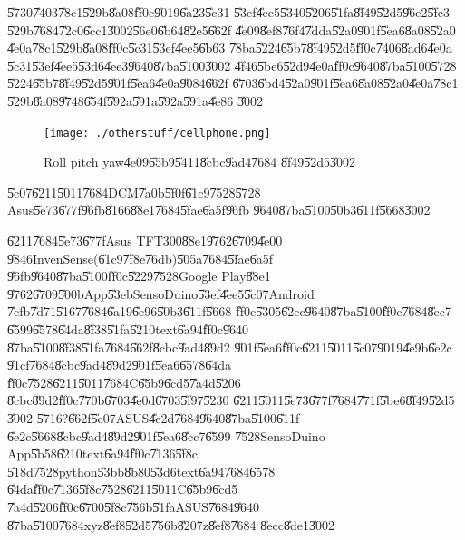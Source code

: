 \U{5730}\U{7403}\U{78c1}\U{529b}\U{8a08}\U{ff0c}\U{9019}\U{6a23}\U{5c31}%
\U{53ef}\U{4ee5}\U{5340}\U{5206}\U{51fa}\U{8f49}\U{52d5}\U{96e2}\U{5fc3}%
\U{529b}\U{7684}\U{72c0}\U{6cc1}\U{3002}\U{56e0}\U{6b64}\U{82e5}\U{662f}%
\U{4e09}\U{8ef8}\U{76f4}\U{7dda}\U{52a0}\U{901f}\U{5ea6}\U{8a08}\U{52a0}%
\U{4e0a}\U{78c1}\U{529b}\U{8a08}\U{ff0c}\U{5c31}\U{53ef}\U{4ee5}\U{6b63}%
\U{78ba}\U{5224}\U{65b7}\U{8f49}\U{52d5}\U{ff0c}\U{7406}\U{8ad6}\U{4e0a}%
\U{5c31}\U{53ef}\U{4ee5}\U{53d6}\U{4ee3}\U{9640}\U{87ba}\U{5100}\U{3002}%
\U{4f46}\U{5be6}\U{52d9}\U{4e0a}\U{ff0c}\U{9640}\U{87ba}\U{5100}\U{5728}%
\U{5224}\U{65b7}\U{8f49}\U{52d5}\U{901f}\U{5ea6}\U{4e0a}\U{9084}\U{662f}%
\U{6703}\U{6bd4}\U{52a0}\U{901f}\U{5ea6}\U{8a08}\U{52a0}\U{4e0a}\U{78c1}%
\U{529b}\U{8a08}\U{9748}\U{654f}\U{592a}\U{591a}\U{592a}\U{591a}\U{4e86}%
\U{3002}

\clearpage%

\begin{figure}[th]
\caption{Roll pitch yaw\U{4e09}\U{65b9}\U{5411}\U{8cbc}\U{9ad4}\U{7684}%
\U{8f49}\U{52d5}\U{3002}}
\begin{center}
\texttt{[image: ./otherstuff/cellphone.png]}
\end{center}
\end{figure}

\begin{case}
\U{5c07}\U{6211}\U{5011}\U{7684}DCM\U{7a0b}\U{5f0f}\U{61c9}\U{7528}\U{5728}%
Asus\U{5e73}\U{677f}\U{96fb}\U{8166}\U{88e1}\U{7684}\U{5fae}\U{6a5f}\U{96fb}%
\U{9640}\U{87ba}\U{5100}\U{50b3}\U{611f}\U{5668}\U{3002}
\end{case}

\U{6211}\U{7684}\U{5e73}\U{677f}Asus TFT300\U{88e1}\U{9762}\U{6709}\U{4e00}%
\U{9846}InvenSense(\U{61c9}\U{7f8e}\U{76db})\U{505a}\U{7684}\U{5fae}\U{6a5f}%
\U{96fb}\U{9640}\U{87ba}\U{5100}\U{ff0c}\U{5229}\U{7528}Google Play\U{88e1}%
\U{9762}\U{6709}\U{500b}App\U{53eb}SensoDuino\U{53ef}\U{4ee5}\U{5c07}Android%
\U{7cfb}\U{7d71}\U{5167}\U{7684}\U{6a19}\U{6e96}\U{50b3}\U{611f}\U{5668}%
\U{ff0c}\U{5305}\U{62ec}\U{9640}\U{87ba}\U{5100}\U{ff0c}\U{7684}\U{8cc7}%
\U{6599}\U{6578}\U{64da}\U{8f38}\U{51fa}\U{6210}text\U{6a94}\U{ff0c}\U{9640}%
\U{87ba}\U{5100}\U{8f38}\U{51fa}\U{7684}\U{662f}\U{8cbc}\U{9ad4}\U{89d2}%
\U{901f}\U{5ea6}\U{ff0c}\U{6211}\U{5011}\U{5c07}\U{9019}\U{4e9b}\U{6e2c}%
\U{91cf}\U{7684}\U{8cbc}\U{9ad4}\U{89d2}\U{901f}\U{5ea6}\U{6578}\U{64da}%
\U{ff0c}\U{7528}\U{6211}\U{5011}\U{7684}C\U{65b9}\U{6cd5}\U{7a4d}\U{5206}%
\U{8cbc}\U{89d2}\U{ff0c}\U{770b}\U{6703}\U{4e0d}\U{6703}\U{5f97}\U{5230}%
\U{6211}\U{5011}\U{5e73}\U{677f}\U{7684}\U{771f}\U{5be6}\U{8f49}\U{52d5}%
\U{3002}\newline
\U{5716}?\U{662f}\U{5c07}ASUS\U{4e2d}\U{7684}\U{9640}\U{87ba}\U{5100}\U{611f}%
\U{6e2c}\U{5668}\U{8cbc}\U{9ad4}\U{89d2}\U{901f}\U{5ea6}\U{8cc7}\U{6599}%
\U{7528}SensoDuino App\U{5b58}\U{6210}text\U{6a94}\U{ff0c}\U{7136}\U{5f8c}%
\U{518d}\U{7528}python\U{53bb}\U{8b80}\U{53d6}text\U{6a94}\U{7684}\U{6578}%
\U{64da}\U{ff0c}\U{7136}\U{5f8c}\U{7528}\U{6211}\U{5011}C\U{65b9}\U{6cd5}%
\U{7a4d}\U{5206}\U{ff0c}\U{6700}\U{5f8c}\U{756b}\U{51fa}ASUS\U{7684}\U{9640}%
\U{87ba}\U{5100}\U{7684}xyz\U{8ef8}\U{52d5}\U{756b}\U{8207}z\U{8ef8}\U{7684}%
\U{8ecc}\U{8de1}\U{3002}

